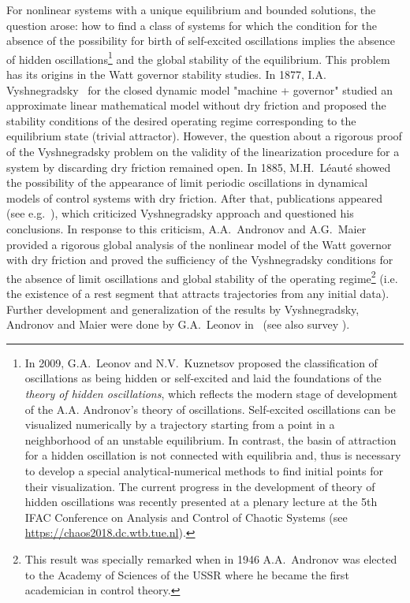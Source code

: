 \documentclass{ifacconf}
\theoremstyle{plain}
\begin{document}
For nonlinear systems with a unique equilibrium and bounded solutions,
the question arose: how to find a class of systems for which
the condition for the absence of the possibility for birth of self-excited oscillations
implies the absence of hidden oscillations\footnote{
In 2009, G.A.~Leonov and N.V.~Kuznetsov
proposed the classification of oscillations as being hidden or self-excited
and laid the foundations of the \emph{theory of hidden oscillations}, which
reflects the modern stage of development of the A.A. Andronov's theory of oscillations.
Self-excited oscillations can be visualized numerically
by a trajectory starting from a point in a neighborhood of an unstable equilibrium.
In contrast, the basin of attraction for a hidden oscillation is not connected with equilibria
and, thus is necessary to develop a special analytical-numerical methods
to find initial points for their visualization.
The current progress in the development of theory of hidden oscillations was
recently presented at a plenary lecture at
the 5th IFAC Conference on Analysis and Control of Chaotic Systems
(see \url{https://chaos2018.dc.wtb.tue.nl}).
} and the global stability of the equilibrium.
This problem has its origins in the Watt governor stability studies.
In 1877, I.A. Vyshnegradsky~\citep{Vyshnegradsky-1877}
for the closed dynamic model "machine + governor"
studied an approximate linear mathematical model without dry friction and
proposed the stability conditions
of the desired operating regime corresponding to the equilibrium state (trivial attractor).
However, the question about a rigorous proof of the Vyshnegradsky problem
on the validity of the linearization procedure for a system by discarding dry friction
remained open.
In 1885, M.H.~L\'{e}aut\'{e} showed~\citep{Leaute-1885} %
the possibility of the appearance of limit periodic oscillations in
dynamical models of control systems with dry friction.
After that, publications appeared (see e.g.~\citep[p.~6]{Zhukovsky-1909}),
which criticized Vyshnegradsky approach and questioned his conclusions.
In response to this criticism, A.A.~Andronov and A.G.~Maier~\citep{AndronovM-1944}
provided a rigorous global analysis of the nonlinear model of the Watt governor with dry friction
and proved the sufficiency of the Vyshnegradsky conditions
for the absence of limit oscillations and global stability of the operating regime\footnote{
  This result was specially remarked when in 1946 A.A.~Andronov was elected to
  the Academy of Sciences of the USSR where he
  became the first academician in control theory.
} (i.e. the existence of a rest segment that attracts trajectories from any initial data).
Further development and generalization of the results by Vyshnegradsky, Andronov and Maier
were done by G.A.~Leonov in~\citep{Leonov-1971} (see also survey \citep{LeonovKKM-2017}).
\end{document}
